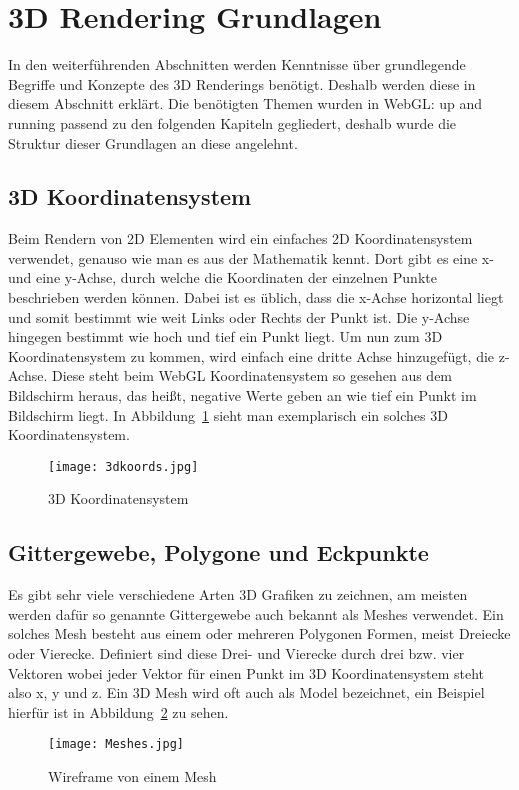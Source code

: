 \section{3D Rendering Grundlagen}
In den weiterführenden Abschnitten werden Kenntnisse über grundlegende Begriffe und Konzepte des 3D Renderings benötigt.
Deshalb werden diese in diesem Abschnitt erklärt.
Die benötigten Themen wurden in WebGL: up and running \cite[4-9]{parisi2012webgl} passend zu den folgenden Kapiteln gegliedert, deshalb wurde die Struktur dieser Grundlagen an diese angelehnt.

\subsection{3D Koordinatensystem}
Beim Rendern von 2D Elementen wird ein einfaches 2D Koordinatensystem verwendet, genauso wie man es aus der Mathematik kennt. Dort gibt es eine x- und eine y-Achse, durch welche die Koordinaten der einzelnen Punkte beschrieben werden können.
Dabei ist es üblich, dass die x-Achse horizontal liegt und somit bestimmt wie weit Links oder Rechts der Punkt ist. Die y-Achse hingegen bestimmt wie hoch und tief ein Punkt liegt.
Um nun zum 3D Koordinatensystem zu kommen, wird einfach eine dritte Achse hinzugefügt, die z-Achse. Diese steht beim WebGL Koordinatensystem so gesehen aus dem Bildschirm heraus, das heißt,
 negative Werte geben an wie tief ein Punkt im Bildschirm liegt. \cite[4]{parisi2012webgl} In Abbildung~\ref{fig:3DKoordinatensystem} sieht man exemplarisch ein solches 3D Koordinatensystem.
 \begin{figure}
    \centering
    \texttt{[image: 3dkoords.jpg]}
    \caption{3D Koordinatensystem \cite{PeterStrohm}} \label{fig:3DKoordinatensystem}
    \end{figure}

\subsection{Gittergewebe, Polygone und Eckpunkte}
Es gibt sehr viele verschiedene Arten 3D Grafiken zu zeichnen, am meisten werden dafür so genannte Gittergewebe auch bekannt als Meshes verwendet.
Ein solches Mesh besteht aus einem oder mehreren Polygonen Formen, meist Dreiecke oder Vierecke. Definiert sind diese Drei- und Vierecke durch drei bzw.
vier Vektoren wobei jeder Vektor für einen Punkt im 3D Koordinatensystem steht also x, y und z.
Ein 3D Mesh wird oft auch als Model bezeichnet, ein Beispiel hierfür ist in Abbildung~\ref{fig:Mesh} zu sehen. \cite[4]{parisi2012webgl}
\begin{figure}
    \centering
    \texttt{[image: Meshes.jpg]}
    \caption{Wireframe von einem Mesh \cite{sketchfab}} \label{fig:Mesh}
    \end{figure}

